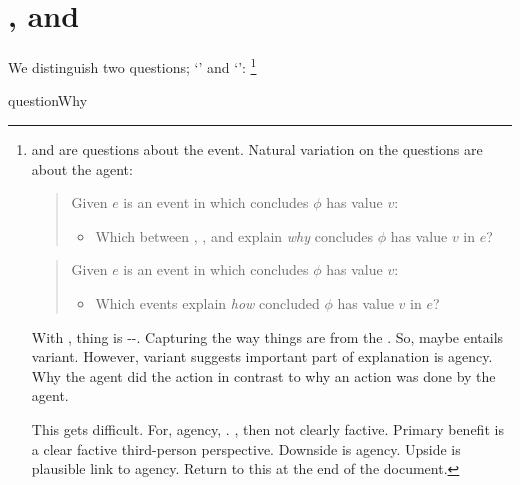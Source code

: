 \section*{\qWhy{}, \qHow{} and \issueInclusion{}}
\label{cha:intro:why-how}

\begin{note}
  We distinguish two questions; `\qWhy{}' and `\qHow{}':%
  \footnote{
    \qWhy{} and \qHow{} are questions about the event.
    Natural variation on the questions are about the agent:

    \begin{quote}
      Given \(e\) is an event in which \vAgent{} concludes \(\phi\) has value \(v\):
    \begin{itemize}
    \item
      Which \ros{} between , , and  explain \emph{why} \vAgent{} concludes \(\phi\) has value \(v\) in \(e\)?
    \end{itemize}
  \end{quote}

  \begin{quote}
    Given \(e\) is an event in which \vAgent{} concludes \(\phi\) has value \(v\):
    \begin{itemize}
    \item
      Which events explain \emph{how} \vAgent{} concluded \(\phi\) has value \(v\) in \(e\)?
    \end{itemize}
  \end{quote}

  With \qWhy{}, thing is --.
  Capturing the way things are from the \agpe{}.
  So, maybe entails variant.
  However, variant suggests important part of explanation is agency.
  Why the agent did the action in contrast to why an action was done by the agent.

  This gets difficult.
  For, agency, \agpe{}.
  \agpe{}, then not clearly factive.
  Primary benefit is a clear factive third-person perspective.
  Downside is agency.
  Upside is plausible link to agency.
  Return to this at the end of the document.
  }

  \begin{question}{questionWhy}{\qWhy{}}
    \medskip


\end{question}
\end{note}
